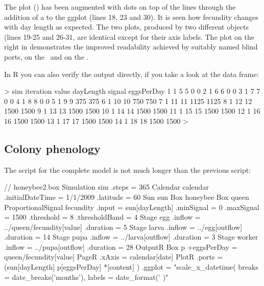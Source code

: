 The plot () has been augmented with dots on top of the lines through the addition of a  to the ggplot (lines 18, 23 and 30). It is seen how fecundity changes with day length as expected. The two plots, produced by two different  objects (lines 19-25 and 26-31, are identical except for their axis labels. The plot on the right in  demonstrates the improved readability achieved by suitably named blind ports,  on the \xaxis\ and  on the \yaxis.

In R you can also verify the output directly, if you take a look at the  data frame:

\begin{rdialog}
> sim
   iteration value dayLength signal eggsPerDay
1          1     5         5      0          0
2          1     6         6      0          0
3          1     7         7      0          0
4          1     8         8      0          0
5          1     9         9    375        375
6          1    10        10    750        750
7          1    11        11   1125       1125
8          1    12        12   1500       1500
9          1    13        13   1500       1500
10         1    14        14   1500       1500
11         1    15        15   1500       1500
12         1    16        16   1500       1500
13         1    17        17   1500       1500
14         1    18        18   1500       1500
> 
\end{rdialog}

\subsection{Colony phenology}

The script for the complete model is not much longer than the previous script:

\lstset{numbers=left}
\begin{boxscript}
// honeybee2.box
Simulation sim {
  .steps = 365
  Calendar calendar {
    .initialDateTime = 1/1/2009
    .latitude = 60
  }
  Sun sun {
  }
  Box honeybee {
    Box queen {
      ProportionalSignal fecundity {
        .input = sun[dayLength]
        .minSignal = 0
        .maxSignal = 1500
        .threshold = 8
        .thresholdBand = 4
      }
    }
    Stage egg {
      .inflow = ../queen/fecundity[value]
      .duration = 5
    }
    Stage larva {
      .inflow = ../egg[outflow]
      .duration = 14
    }
    Stage pupa {
      .inflow = ../larva[outflow]
      .duration = 3
    }
    Stage worker {
      .inflow = ../pupa[outflow]
      .duration = 28
    }
  }
  OutputR {
    Box p {
      +eggsPerDay = queen/fecundity[value]
    }
    PageR {
      .xAxis = calendar[date]
      PlotR {
        .ports = (sun[dayLength] 
                   p[eggsPerDay] 
                   *[content] )
        .ggplot = "scale_x_datetime( 
                      breaks = date_breaks('months'), 
                     labels = date_format('%
                    )"
      }
    }
  }
}\end{boxscript}
\lstset{numbers=none}

